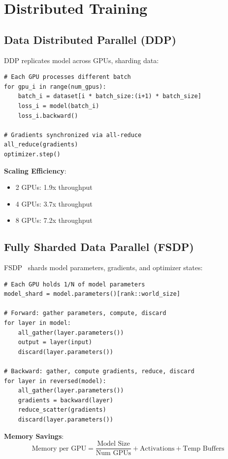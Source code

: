 \section{Distributed Training}


\subsection{Data Distributed Parallel (DDP)}

DDP replicates model across GPUs, sharding data:

\begin{verbatim}
# Each GPU processes different batch
for gpu_i in range(num_gpus):
    batch_i = dataset[i * batch_size:(i+1) * batch_size]
    loss_i = model(batch_i)
    loss_i.backward()

# Gradients synchronized via all-reduce
all_reduce(gradients)
optimizer.step()
\end{verbatim}

\textbf{Scaling Efficiency}:
\begin{itemize}
\item 2 GPUs: 1.9x throughput
\item 4 GPUs: 3.7x throughput
\item 8 GPUs: 7.2x throughput
\end{itemize}

\subsection{Fully Sharded Data Parallel (FSDP)}

FSDP~\citep{zhao2023pytorch} shards model parameters, gradients, and optimizer states:

\begin{verbatim}
# Each GPU holds 1/N of model parameters
model_shard = model.parameters()[rank::world_size]

# Forward: gather parameters, compute, discard
for layer in model:
    all_gather(layer.parameters())
    output = layer(input)
    discard(layer.parameters())

# Backward: gather, compute gradients, reduce, discard
for layer in reversed(model):
    all_gather(layer.parameters())
    gradients = backward(layer)
    reduce_scatter(gradients)
    discard(layer.parameters())
\end{verbatim}

\textbf{Memory Savings}:
\begin{equation}
\text{Memory per GPU} = \frac{\text{Model Size}}{\text{Num GPUs}} + \text{Activations} + \text{Temp Buffers}
\end{equation}

